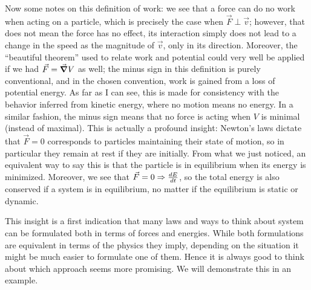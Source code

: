 \documentclass[../class_mech_main.tex]{subfiles}
\begin{document}
Now some notes on this definition of work: we see that a force can do no work when acting on a particle, which is precisely the case when $\vec{F} \perp \vec{v}$; however, that does not mean the force has no effect, its interaction simply does not lead to a change in the speed as the magnitude of $\vec{v}$, only in its direction. Moreover, the \enquote{beautiful theorem} used to relate work and potential could very well be applied if we had $\vec{F} = \grad V$ as well; the minus sign in this definition is purely conventional, and in the chosen convention, work is gained from a loss of potential energy. As far as I can see, this is made for consistency with the behavior inferred from kinetic energy, where no motion means no energy. In a similar fashion, the minus sign means that no force is acting when $V$ is minimal (instead of maximal). This is actually a profound insight: Newton's laws dictate that $\vec{F} = 0$ corresponds to particles maintaining their state of motion, so in particular they remain at rest if they are initially. From what we just noticed, an equivalent way to say this is that the particle is in equilibrium when its energy is minimized. Moreover, we see that $\vec{F} = 0 \Rightarrow \dv{E}{t}$, so the total energy is also conserved if a system is in equilibrium, no matter if the equilibrium is static or dynamic.


This insight is a first indication that many laws and ways to think about system can be formulated both in terms of forces and energies. While both formulations are equivalent in terms of the physics they imply, depending on the situation it might be much easier to formulate one of them. Hence it is always good to think about which approach seems more promising. We will demonstrate this in an example.
\end{document}
